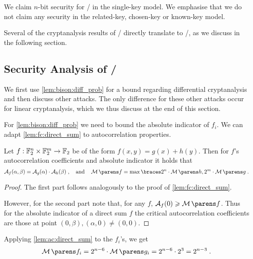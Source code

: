 \begin{secclaim}[\wisent/]
  We claim $n$-bit security for \wisent/ in the single-key model.
  We emphasise that we do not claim any security in the related-key, chosen-key or known-key model.
\end{secclaim}

Several of the cryptanalysis results of \bison/ directly translate to \wisent/, as we discuss in the following section.

\subsection{Security Analysis of \wisent/}\label{sec:wisent:analysis}

We first use \cref{lem:bison:diff_prob} for a bound regarding differential cryptanalysis and then discuss other attacks.
The only difference for these other attacks occur for linear cryptanalysis, which we thus discuss at the end of this section.

For \cref{lem:bison:diff_prob} we need to bound the absolute indicator of $f_i$.
We can adapt \cref{lem:fc:direct_sum} to autocorrelation properties.
\begin{lemma}\label{lem:ac:direct_sum}
    Let $f : \mathbb{F}_2^n \times \mathbb{F}_2^m \to \mathbb{F}_2$ be of the form $f(x, y) = g(x) + h(y)$.
    Then for $f$'s autocorrelation coefficients and absolute indicator it holds that
    \begin{equation*}
        \AC{f}(\alpha, \beta) = \AC{g}(\alpha) \cdot \AC{h}(\beta)\;,
        \quad\text{and}\quad
        \absoluteindicator{f} = \max \set{2^n \cdot \absoluteindicator{h}, 2^m \cdot \absoluteindicator{g}}\;.
    \end{equation*}
\end{lemma}
\begin{proof}
    The first part follows analogously to the proof of \cref{lem:fc:direct_sum}.

    However, for the second part note that, for any $f$, $\AC{f}(0) \geqslant \absoluteindicator{f}$.
    Thus for the absolute indicator of a direct sum $f$ the critical autocorrelation coefficients are those at point $(0,\beta), (\alpha, 0) \neq (0, 0)$.
\end{proof}

Applying \cref{lem:ac:direct_sum} to the $f_i$'s, we get
\begin{equation*}
    \absoluteindicator{f_i} = 2^{n-6} \cdot \absoluteindicator{g_i} = 2^{n-6} \cdot 2^3 = 2^{n-3}\;.
\end{equation*}

